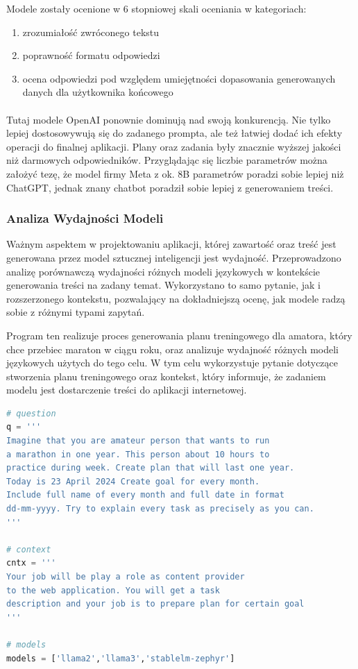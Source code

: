 \noindent Modele zostały ocenione w 6 stopniowej skali oceniania w kategoriach:
\begin{enumerate}
    \item zrozumiałość zwróconego tekstu
    \item poprawność formatu odpowiedzi
    \item ocena odpowiedzi pod względem umiejętności dopasowania generowanych danych dla użytkownika końcowego
\end{enumerate}

\paragraph{} Tutaj modele OpenAI ponownie dominują nad swoją konkurencją. Nie tylko lepiej dostosowywują się do zadanego prompta, ale też łatwiej dodać ich efekty operacji do finalnej aplikacji.
Plany oraz zadania były znacznie wyższej jakości niż darmowych odpowiedników. Przyglądając się liczbie parametrów można założyć tezę, że model firmy Meta z  ok. 8B parametrów poradzi sobie lepiej niż ChatGPT, jednak znany chatbot poradził sobie lepiej z generowaniem treści.

\clearpage

\subsubsection{Analiza Wydajności Modeli}

Ważnym aspektem w projektowaniu aplikacji, której zawartość oraz treść jest generowana przez model sztucznej inteligencji jest wydajność. Przeprowadzono analizę porównawczą wydajności różnych modeli językowych w kontekście generowania treści na zadany temat. Wykorzystano to samo pytanie, jak i rozszerzonego kontekstu, pozwalający na dokładniejszą ocenę, jak modele radzą sobie z różnymi typami zapytań.

Program ten realizuje proces generowania planu treningowego dla amatora, który chce przebiec maraton w ciągu roku, oraz analizuje wydajność różnych modeli językowych użytych do tego celu. W tym celu wykorzystuje pytanie dotyczące stworzenia planu treningowego oraz kontekst, który informuje, że zadaniem modelu jest dostarczenie treści do aplikacji internetowej.

\begin{lstlisting}[language=python, caption=Krok generowania planu treningowego]
# question
q = '''
Imagine that you are amateur person that wants to run 
a marathon in one year. This person about 10 hours to 
practice during week. Create plan that will last one year. 
Today is 23 April 2024 Create goal for every month. 
Include full name of every month and full date in format 
dd-mm-yyyy. Try to explain every task as precisely as you can.
'''

# context
cntx = '''
Your job will be play a role as content provider 
to the web application. You will get a task 
description and your job is to prepare plan for certain goal
'''

# models
models = ['llama2','llama3','stablelm-zephyr']
\end{lstlisting}

